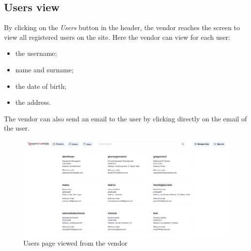 \subsection{Users view}
By clicking on the \textit{Users} button in the header, the vendor reaches the screen to view all registered users on the site.
Here the vendor can view for each user:
\begin{itemize}
    \item the username;
    \item name and surname;
    \item the date of birth;
    \item the address.
\end{itemize}
The vendor can also send an email to the user by clicking directly on the email of the user.
\begin{figure}[!ht]
    \caption{Users page viewed from the vendor}
    \vspace{5px}
    \includegraphics[scale=0.25]{../../../../Images/userManual/usersVendor.png}
    \centering
\end{figure}
\pagebreak
